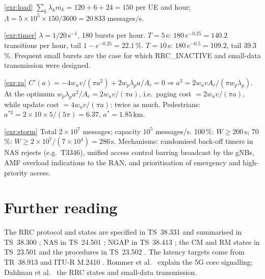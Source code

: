 \documentclass[11pt,a4paper]{article}
\begin{document}
\begin{solutionbox}{\ref{exr:load}}
$\sum_k \lambda_k m_k = 120 + 6 + 24 = 150$ per UE and hour; $\Lambda = 5\times10^5\times150/3600 = 20\,833$ messages/s.
\end{solutionbox}

\begin{solutionbox}{\ref{exr:timer}}
$\lambda = 1/20$\,s$^{-1}$, 180 bursts per hour. $T = 5$\,s: $180\,e^{-0.25} = 140.2$ transitions per hour, tail $1 - e^{-0.25} = 22.1\,\%$. $T = 10$\,s: $180\,e^{-0.5} = 109.2$,
tail 39.3\,\%. Frequent small bursts are the case for which RRC\_INACTIVE and small-data transmission were designed.
\end{solutionbox}

\begin{solutionbox}{\ref{exr:ra}}
$C'(a) = -4w_uv/(\pi a^2) + 2w_p\lambda_p a/A_c = 0 \Rightarrow a^3 = 2w_uvA_c/(\pi w_p\lambda_p)$. At the optimum $w_p\lambda_p a^2/A_c = 2w_uv/(\pi a)$, i.e.\ paging cost $= 2w_uv/(\pi a)$,
while update cost $= 4w_uv/(\pi a)$: twice as much. Pedestrians: $a^{*3} = 2\times10\times5/(5\pi) = 6.37$, $a^{*} = 1.85$\,km.
\end{solutionbox}

\begin{solutionbox}{\ref{exr:storm}}
Total $2\times10^{7}$ messages; capacity $10^{5}$ messages/s. 100\,\%: $W \ge 200$\,s; 70\,\%: $W \ge 2\times10^{7}/(7\times10^{4}) = 286$\,s. Mechanisms: randomised back-off timers in NAS
rejects (e.g.\ T3346), unified access control barring broadcast by the gNBs, AMF overload indications to the RAN, and prioritisation of emergency and high-priority
access.
\end{solutionbox}

\section{Further reading}
The RRC protocol and states are specified in TS~38.331 \cite{ts38331} and summarised in TS~38.300 \cite{ts38300}; NAS in TS~24.501 \cite{ts24501}; NGAP in TS~38.413
\cite{ts38413}; the CM and RM states in TS~23.501 \cite{ts23501} and the procedures in TS~23.502 \cite{ts23502}. The latency targets come from TR~38.913 \cite{tr38913} and
ITU-R M.2410 \cite{itu2017m2410}. Rommer et al.\ \cite{rommer2020core} explain the 5G core signalling; Dahlman et al.\ \cite{dahlman2020nr} the RRC states and small-data
transmission.

\printbibliography[heading=subbibliography,title={\ACNstrRefs}]
\end{document}
